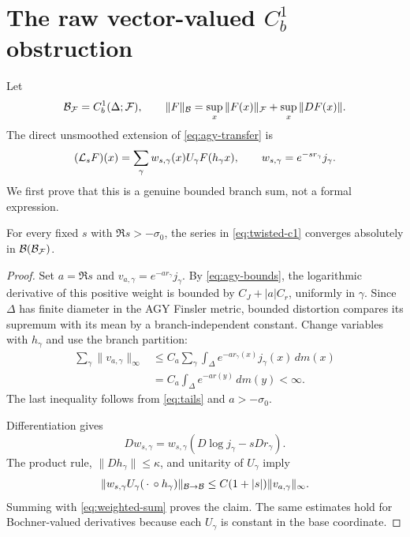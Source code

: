 \section{The raw vector-valued \texorpdfstring{\(C_b^1\)}{C1} obstruction}
\label{sec:c1}

Let
\[
 \mathcal B_\mathcal F=C_b^1(\Delta;\mathcal F),
 \qquad
 \|F\|_{\mathcal B}=\sup_x\|F(x)\|_\mathcal F+\sup_x\|DF(x)\|.
\]
The direct unsmoothed extension of \eqref{eq:agy-transfer} is
\begin{equation}
 (\mathcal L_sF)(x)=\sum_\gamma
 w_{s,\gamma}(x)U_\gamma F(h_\gamma x),
 \qquad
 w_{s,\gamma}=e^{-sr_\gamma}j_\gamma.
 \label{eq:twisted-c1}
\end{equation}
We first prove that this is a genuine bounded branch sum, not a formal
expression.

\begin{proposition}
\label{prop:c1-sum}
For every fixed \(s\) with \(\Re s>-\sigma _0\), the series in
\eqref{eq:twisted-c1} converges absolutely in
\(\mathcal B(\mathcal B_\mathcal F)\).
\end{proposition}

\begin{proof}
Set \(a=\Re s\) and
\(v_{a,\gamma}=e^{-a r_\gamma}j_\gamma\).  By
\eqref{eq:agy-bounds}, the logarithmic derivative of this positive weight is
bounded by \(C_J+|a|C_r\), uniformly in \(\gamma\).  Since \(\Delta\) has
finite diameter in the AGY Finsler metric, bounded distortion compares its
supremum with its mean by a branch-independent constant.  Change variables
with \(h_\gamma\) and use
the branch partition:
\begin{align}
 \sum_\gamma\|v_{a,\gamma}\|_\infty
 &\le C_a\sum_\gamma\int_\Delta
   e^{-a r_\gamma(x)}j_\gamma(x)\,dm(x)\\
 &=C_a\int_\Delta e^{-ar(y)}\,dm(y)<\infty.
 \label{eq:weighted-sum}
\end{align}
The last inequality follows from \eqref{eq:tails} and
\(a>-\sigma _0\).

Differentiation gives
\[
 Dw_{s,\gamma}
 =w_{s,\gamma}(D\log j_\gamma-sDr_\gamma).
\]
The product rule, \(\|Dh_\gamma\|\le\kappa\), and unitarity of
\(U_\gamma\) imply
\[
 \|w_{s,\gamma}U_\gamma(\,\cdot\,\circ h_\gamma)\|_{\mathcal B\to\mathcal B}
 \le C(1+|s|)\|v_{a,\gamma}\|_\infty.
\]
Summing with \eqref{eq:weighted-sum} proves the claim.  The same estimates
hold for Bochner-valued derivatives because each \(U_\gamma\) is constant in
the base coordinate.
\end{proof}

